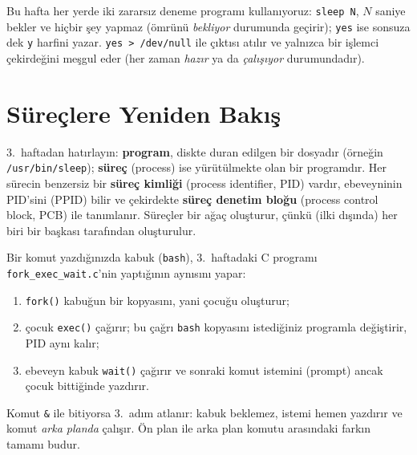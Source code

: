\documentclass[11pt,a4paper]{article}
\newcommand{\term}[1]{\textbf{\color{mintdeep}#1}}
\newcommand{\cmd}[1]{\texttt{#1}}
\begin{document}
Bu hafta her yerde iki zararsız deneme programı kullanıyoruz: \cmd{sleep N}, $N$ saniye bekler ve hiçbir şey yapmaz (ömrünü \emph{bekliyor} durumunda geçirir); \cmd{yes} ise sonsuza dek \texttt{y} harfini yazar. \cmd{yes > /dev/null} ile çıktısı atılır ve yalnızca bir işlemci çekirdeğini meşgul eder (her zaman \emph{hazır} ya da \emph{çalışıyor} durumundadır).

\section{Süreçlere Yeniden Bakış}
\label{sec:revisit}

3.~haftadan hatırlayın: \term{program}, diskte duran edilgen bir dosyadır (örneğin \texttt{/usr/bin/sleep}); \term{süreç} (process) ise yürütülmekte olan bir programdır. Her sürecin benzersiz bir \term{süreç kimliği} (process identifier, PID) vardır, ebeveyninin PID'sini (PPID) bilir ve çekirdekte \term{süreç denetim bloğu} (process control block, PCB) ile tanımlanır. Süreçler bir ağaç oluşturur, çünkü (ilki dışında) her biri bir başkası tarafından oluşturulur.

Bir komut yazdığınızda kabuk (\cmd{bash}), 3.~haftadaki C programı \texttt{fork\_exec\_wait.c}'nin yaptığının aynısını yapar:
\begin{enumerate}[leftmargin=1.4em]
  \item \cmd{fork()} kabuğun bir kopyasını, yani çocuğu oluşturur;
  \item çocuk \cmd{exec()} çağırır; bu çağrı \cmd{bash} kopyasını istediğiniz programla değiştirir, PID aynı kalır;
  \item ebeveyn kabuk \cmd{wait()} çağırır ve sonraki komut istemini (prompt) ancak çocuk bittiğinde yazdırır.
\end{enumerate}
Komut \texttt{\&} ile bitiyorsa 3.~adım atlanır: kabuk beklemez, istemi hemen yazdırır ve komut \emph{arka planda} çalışır. Ön plan ile arka plan komutu arasındaki farkın tamamı budur.
\end{document}
